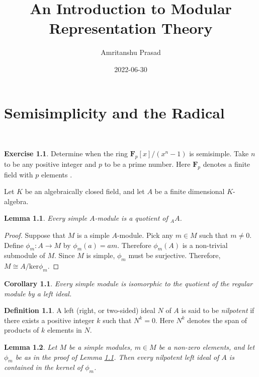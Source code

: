 \documentclass[
]{book}
\title{An Introduction to Modular Representation Theory}
\author{Amritanshu Prasad}
\date{2022-06-30}
\DeclareMathOperator*{\End}{End}
\newtheorem{lemma}{Lemma}[chapter]
\newtheorem{corollary}{Corollary}[chapter]
\theoremstyle{definition}
\newtheorem{definition}{Definition}[chapter]
\theoremstyle{definition}
\theoremstyle{definition}
\newtheorem{exercise}{Exercise}[chapter]
\theoremstyle{definition}
\theoremstyle{remark}
\begin{document}
\maketitle

{
\setcounter{tocdepth}{1}
\tableofcontents
}
\hypertarget{semisimplicity-and-the-radical}{%
\chapter{Semisimplicity and the Radical}\label{semisimplicity-and-the-radical}}

\(\DeclareMathOperator*{\End}{End}\)
\(\DeclareMathOperator*{\rad}{rad}\)

\begin{exercise}
Determine when the ring \(\mathbf{F}_p[x]/(x^n-1)\) is semisimple.
Take \(n\) to be any positive integer and \(p\) to be a prime number.
Here \(\mathbf{F}_p\) denotes a finite field with \(p\) elements \citet{MR1715145}.
\end{exercise}

Let \(K\) be an algebraically closed field, and let \(A\) be a finite dimensional \(K\)-algebra.

\begin{lemma}
\protect\hypertarget{lem:simple}{}\label{lem:simple}Every simple \(A\)-module is a quotient of \({}_AA\).
\end{lemma}

\begin{proof}
Suppose that \(M\) is a simple \(A\)-module.
Pick any \(m\in M\) such that \(m\neq 0\).
Define \(\phi_m:A\to M\) by \(\phi_m(a)=am\).
Therefore \(\phi_m(A)\) is a non-trivial submodule of \(M\).
Since \(M\) is simple, \(\phi_m\) must be surjective.
Therefore, \(M\cong A/\mathrm{ker}\phi_m\).
\end{proof}

\begin{corollary}
Every simple module is isomorphic to the quotient of the regular module by a left ideal.
\end{corollary}

\begin{definition}
A left (right, or two-sided) ideal \(N\) of \(A\) is said to be \emph{nilpotent} if there exists a positive integer \(k\) such that \(N^k=0\).
Here \(N^k\) denotes the span of products of \(k\) elements in \(N\).
\end{definition}

\begin{lemma}
\protect\hypertarget{lem:nilker}{}\label{lem:nilker}Let \(M\) be a simple modules, \(m\in M\) be a non-zero elements, and let \(\phi_m\) be as in the proof of Lemma \ref{lem:simple}.
Then every nilpotent left ideal of \(A\) is contained in the kernel of \(\phi_m\).
\end{lemma}
\end{document}
